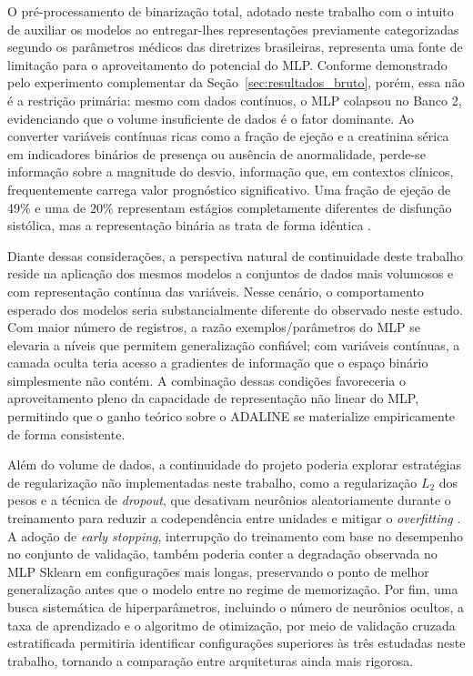 O pré-processamento de binarização total, adotado neste trabalho com o intuito de auxiliar os modelos ao entregar-lhes representações previamente categorizadas segundo os parâmetros médicos das diretrizes brasileiras, representa uma fonte de limitação para o aproveitamento do potencial do MLP. Conforme demonstrado pelo experimento complementar da Seção~\ref{sec:resultados_bruto}, porém, essa não é a restrição primária: mesmo com dados contínuos, o MLP colapsou no Banco 2, evidenciando que o volume insuficiente de dados é o fator dominante. Ao converter variáveis contínuas ricas como a fração de ejeção e a creatinina sérica em indicadores binários de presença ou ausência de anormalidade, perde-se informação sobre a magnitude do desvio, informação que, em contextos clínicos, frequentemente carrega valor prognóstico significativo. Uma fração de ejeção de 49\% e uma de 20\% representam estágios completamente diferentes de disfunção sistólica, mas a representação binária as trata de forma idêntica \cite{rohde2018}.

Diante dessas considerações, a perspectiva natural de continuidade deste trabalho reside na aplicação dos mesmos modelos a conjuntos de dados mais volumosos e com representação contínua das variáveis. Nesse cenário, o comportamento esperado dos modelos seria substancialmente diferente do observado neste estudo. Com maior número de registros, a razão exemplos/parâmetros do MLP se elevaria a níveis que permitem generalização confiável; com variáveis contínuas, a camada oculta teria acesso a gradientes de informação que o espaço binário simplesmente não contém. A combinação dessas condições favoreceria o aproveitamento pleno da capacidade de representação não linear do MLP, permitindo que o ganho teórico sobre o ADALINE se materialize empiricamente de forma consistente.

Além do volume de dados, a continuidade do projeto poderia explorar estratégias de regularização não implementadas neste trabalho, como a regularização $L_2$ dos pesos e a técnica de \textit{dropout}, que desativam neurônios aleatoriamente durante o treinamento para reduzir a codependência entre unidades e mitigar o \textit{overfitting} \cite{silva2016}. A adoção de \textit{early stopping}, interrupção do treinamento com base no desempenho no conjunto de validação, também poderia conter a degradação observada no MLP Sklearn em configurações mais longas, preservando o ponto de melhor generalização antes que o modelo entre no regime de memorização. Por fim, uma busca sistemática de hiperparâmetros, incluindo o número de neurônios ocultos, a taxa de aprendizado e o algoritmo de otimização, por meio de validação cruzada estratificada permitiria identificar configurações superiores às três estudadas neste trabalho, tornando a comparação entre arquiteturas ainda mais rigorosa.

